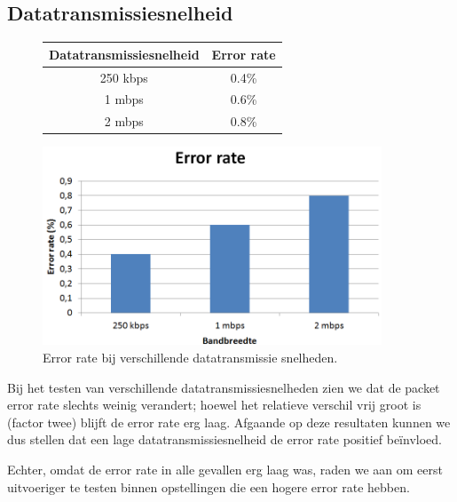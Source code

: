 \documentclass[a4paper,10pt]{article}
\begin{document}
\subsection{Datatransmissiesnelheid}
\begin{figure}[h!]
    \begin{minipage}{\textwidth}
        \begin{minipage}{0.49\textwidth}
            \centering
            \begin{tabular}{cc} \hline
                Datatransmissiesnelheid &  Error rate   \\ \hline
                250 kbps                &  0.4\%        \\
                1 mbps                  &  0.6\%        \\
                2 mbps                  &  0.8\%        \\ \hline
            \end{tabular}
        \end{minipage}
        \hfill
        \begin{minipage}{0.49\textwidth}
            \centering
            \includegraphics[width=0.9\textwidth]{bandbreedte.png}
        \end{minipage}
        \caption{Error rate bij verschillende datatransmissie snelheden.}
    \end{minipage}
\end{figure}
Bij het testen van verschillende datatransmissiesnelheden zien we dat de packet error rate slechts weinig verandert; hoewel het relatieve verschil vrij groot is (factor twee) blijft de error rate erg laag. Afgaande op deze resultaten kunnen we dus stellen dat een lage datatransmissiesnelheid de error rate positief be\"invloed.

Echter, omdat de error rate in alle gevallen erg laag was, raden we aan om eerst uitvoeriger te testen binnen opstellingen die een hogere error rate hebben.
\end{document}

